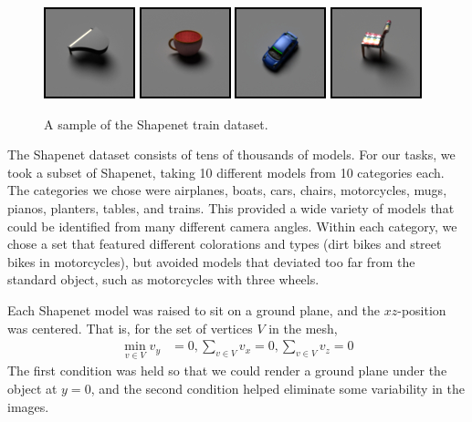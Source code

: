 \documentclass[10pt,twocolumn,letterpaper]{article}
\begin{document}
\begin{figure}[h!]
\centering
\includegraphics[width=0.24\columnwidth]{./assets/piano.jpg}
\includegraphics[width=0.24\columnwidth]{./assets/mug.jpg}
\includegraphics[width=0.24\columnwidth]{./assets/car.jpg}
\includegraphics[width=0.24\columnwidth]{./assets/chair.jpg}
\caption{A sample of the Shapenet train dataset.}
\label{fig:SHAPENET}
\end{figure}

The Shapenet dataset consists of tens of thousands of models. For our tasks, we took a subset of Shapenet, taking 10 different models from 10 categories each. The categories we chose were airplanes, boats, cars, chairs, motorcycles, mugs, pianos, planters, tables, and trains. This provided a wide variety of models that could be identified from many different camera angles. Within each category, we chose a set that featured different colorations and types (dirt bikes and street bikes in motorcycles), but avoided models that deviated too far from the standard object, such as motorcycles with three wheels.

Each Shapenet model was raised to sit on a ground plane, and the $xz$-position was centered. That is, for the set of vertices $V$ in the mesh,
\begin{align*}\min_{v\in V}v_y &= 0, \sum_{v\in V} v_x = 0, \sum_{v\in V} v_z = 0
\end{align*}
The first condition was held so that we could render a ground plane under the object at $y=0$, and the second condition helped eliminate some variability in the images. 
\end{document}

